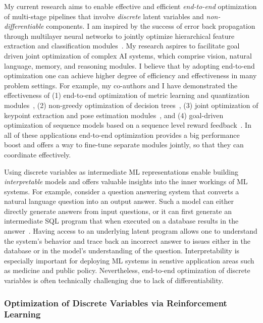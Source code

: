 \documentclass[a4paper, 10pt]{article}
\def\eg{{\em e.g.,}}
\newcommand{\figref}[1]{Figure~\ref{#1}}
\begin{document}
My current research aims to enable effective and efficient {\em
  end-to-end} optimization of multi-stage pipelines that involve {\em
  discrete} latent variables and {\em non-differentiable} components.
I am inspired by the success of error back propagation through
multilayer neural networks to jointly optimize hierarchical feature
extraction and classification modules~\cite{lecun98}.
My research aspires to facilitate goal driven joint optimization of
complex AI systems, which comprise vision, natural language, memory,
and reasoning modules. I believe that by adopting end-to-end
optimization one can achieve higher degree of efficiency and
effectiveness in many problem settings.  For example, my co-authors
and I have demonstrated the effectiveness of (1) end-to-end
optimization of metric learning and quantization
modules~\cite{mlh,hdml}, (2) non-greedy optimization of decision
trees~\cite{engodt}, (3) joint optimization of keypoint extraction and
pose estimation modules~\cite{keypointnet}, and (4) goal-driven
optimization of sequence models based on a sequence level reward
feedback~\cite{mapo,ocd}. In all of these applications end-to-end
optimization provides a big performance boost and offers a way to
fine-tune separate modules jointly, so that they can coordinate effectively.

Using discrete variables as intermediate ML representations enable
building {\em interpretable} models and offers valuable insights into
the inner workings of ML systems. For example, consider a question
answering system that converts a natural language question into an
output answer. Such a model can either directly generate answers from
input questions, or it can first generate an intermediate SQL program
that when executed on a database results in the
answer~\cite{mapo}. Having access to an underlying latent program
allows one to understand the system's behavior and trace back an
incorrect answer to issues either in the database or in the model's
understanding of the question. Interpretability is especially
important for deploying ML systems in senstive application areas such
as medicine and public policy. Nevertheless, end-to-end optimization
of discrete variables is often technically challenging due to lack of
differentiability.

\subsubsection*{Optimization of Discrete Variables via Reinforcement Learning}
\end{document}
